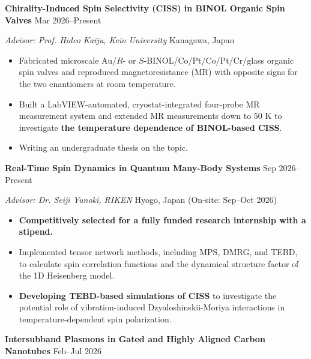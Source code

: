 \documentclass[11pt]{article}
\newcommand{\highlight}[1]{\textcolor{blue!60!cyan}{\textbf{#1}}}
\begin{document}
\textbf{Chirality-Induced Spin Selectivity (CISS) in BINOL Organic Spin Valves}
\hfill Mar 2026--Present

\textit{Advisor: Prof. Hideo Kaiju, Keio University}
\hfill Kanagawa, Japan

\begin{itemize}
\item Fabricated microscale Au/$R$- or $S$-BINOL/Co/Pt/Co/Pt/Cr/glass
organic spin valves and reproduced magnetoresistance (MR) with opposite
signs for the two enantiomers at room temperature.
\item Built a LabVIEW-automated, cryostat-integrated four-probe MR measurement system and extended MR measurements down to 50 K to investigate \highlight{the temperature dependence of BINOL-based CISS}.
\item Writing an undergraduate thesis on the topic.
\end{itemize}


\vspace{5pt}

\textbf{Real-Time Spin Dynamics in Quantum Many-Body Systems}
\hfill Sep 2026--Present

\textit{Advisor: Dr. Seiji Yunoki,  RIKEN}
\hfill Hyogo, Japan (On-site: Sep--Oct 2026)

\begingroup
\sloppy
\begin{itemize}
\item \highlight{Competitively selected for a fully funded research internship with a stipend.}
\item Implemented tensor network methods, including MPS, DMRG, and TEBD, to calculate spin correlation functions and the dynamical structure factor of the 1D Heisenberg model. 
\item \highlight{Developing TEBD-based simulations of CISS} to investigate the potential role of vibration-induced Dzyaloshinskii-Moriya interactions in temperature-dependent spin polarization. 
\end{itemize}
\endgroup

\vspace{5pt}

\textbf{Intersubband Plasmons in Gated and Highly Aligned Carbon Nanotubes}
\hfill Feb--Jul 2026
\end{document}
